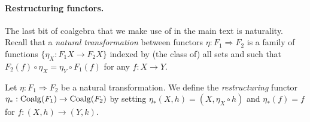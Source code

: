 \documentclass[orivec,envcountsect,envcountsame]{llncs}
\begin{document}



\paragraph*{Restructuring functors.}
The last bit of coalgebra that we make use of in the main text is naturality.
Recall that a \emph{natural transformation} between functors \(\eta : F_1 \Rightarrow F_2\) is a family of functions \(\{\eta_X : F_1X \to F_2X\}\) indexed by (the class of) all sets and such that \(F_2(f) \circ \eta_X = \eta_Y \circ F_1(f)\) for any \(f : X \to Y\).

\begin{definition}
	Let \(\eta : F_1 \Rightarrow F_2\) be a natural transformation.
	We define the \emph{restructuring} functor \(\eta_* : \operatorname{Coalg}(F_1) \to \operatorname{Coalg}(F_2)\) by setting \(\eta_*(X, h) = (X, \eta_X \circ h)\) and \(\eta_*(f) = f\) for \(f \colon (X, h) \to (Y, k)\).
\end{definition}
\end{document}
